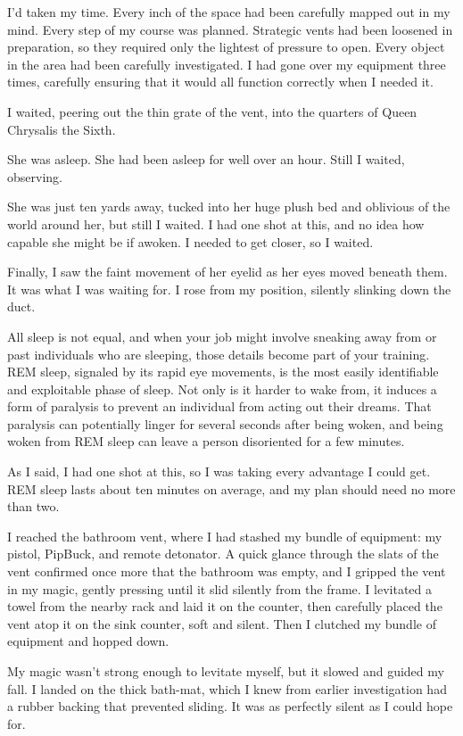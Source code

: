 I’d taken my time. Every inch of the space had been carefully mapped out in my mind. Every step of my course was planned. Strategic vents had been loosened in preparation, so they required only the lightest of pressure to open. Every object in the area had been carefully investigated. I had gone over my equipment three times, carefully ensuring that it would all function correctly when I needed it.

I waited, peering out the thin grate of the vent, into the quarters of Queen Chrysalis the Sixth.

She was asleep. She had been asleep for well over an hour. Still I waited, observing.

She was just ten yards away, tucked into her huge plush bed and oblivious of the world around her, but still I waited. I had one shot at this, and no idea how capable she might be if awoken. I needed to get closer, so I waited.

Finally, I saw the faint movement of her eyelid as her eyes moved beneath them. It was what I was waiting for. I rose from my position, silently slinking down the duct.

All sleep is not equal, and when your job might involve sneaking away from or past individuals who are sleeping, those details become part of your training. REM sleep, signaled by its rapid eye movements, is the most easily identifiable and exploitable phase of sleep. Not only is it harder to wake from, it induces a form of paralysis to prevent an individual from acting out their dreams. That paralysis can potentially linger for several seconds after being woken, and being woken from REM sleep can leave a person disoriented for a few minutes.

As I said, I had one shot at this, so I was taking every advantage I could get. REM sleep lasts about ten minutes on average, and my plan should need no more than two.

I reached the bathroom vent, where I had stashed my bundle of equipment: my pistol, PipBuck, and remote detonator. A quick glance through the slats of the vent confirmed once more that the bathroom was empty, and I gripped the vent in my magic, gently pressing until it slid silently from the frame. I levitated a towel from the nearby rack and laid it on the counter, then carefully placed the vent atop it on the sink counter, soft and silent. Then I clutched my bundle of equipment and hopped down.

My magic wasn’t strong enough to levitate myself, but it slowed and guided my fall. I landed on the thick bath-mat, which I knew from earlier investigation had a rubber backing that prevented sliding. It was as perfectly silent as I could hope for.

